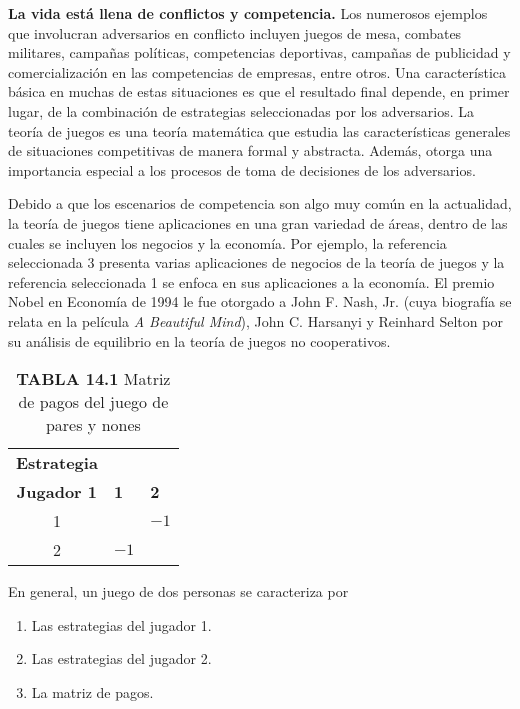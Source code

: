 \documentclass[12pt]{article}
\begin{document}
\noindent
\textbf{La vida está llena de conflictos y competencia.} Los numerosos ejemplos que involucran adversarios en conflicto incluyen juegos de mesa, combates militares, campañas políticas, competencias deportivas, campañas de publicidad y comercialización en las competencias de empresas, entre otros. Una característica básica en muchas de estas situaciones es que el resultado final depende, en primer lugar, de la combinación de estrategias seleccionadas por los adversarios. La teoría de juegos es una teoría matemática que estudia las características generales de situaciones competitivas de manera formal y abstracta. Además, otorga una importancia especial a los procesos de toma de decisiones de los adversarios.

Debido a que los escenarios de competencia son algo muy común en la actualidad, la teoría de juegos tiene aplicaciones en una gran variedad de áreas, dentro de las cuales se incluyen los negocios y la economía. Por ejemplo, la referencia seleccionada 3 presenta varias aplicaciones de negocios de la teoría de juegos y la referencia seleccionada 1 se enfoca en sus aplicaciones a la economía. El premio Nobel en Economía de 1994 le fue otorgado a John F. Nash, Jr. (cuya biografía se relata en la película \textit{A Beautiful Mind}), John C. Harsanyi y Reinhard Selton por su análisis de equilibrio en la teoría de juegos no cooperativos.

\begin{table}[h!]
\centering
\caption*{\textbf{TABLA 14.1} \quad Matriz de pagos del juego de pares y nones}
\begin{tabular}{c>{\centering\arraybackslash}m{1.5cm}>{\centering\arraybackslash}m{1.5cm}}
\toprule
\textbf{Estrategia} & \multicolumn{2}{c}{\textbf{Jugador 2}} \\
\cmidrule(lr){2-3}
\textbf{Jugador 1} & \textbf{1} & \textbf{2} \\
\midrule
1 & 1 & $-1$ \\
2 & $-1$ & 1 \\
\bottomrule
\end{tabular}
\end{table}

\noindent
En general, un juego de dos personas se caracteriza por

\begin{enumerate}
    \item Las estrategias del jugador 1.
    \item Las estrategias del jugador 2.
    \item La matriz de pagos.
\end{enumerate}
\end{document}
